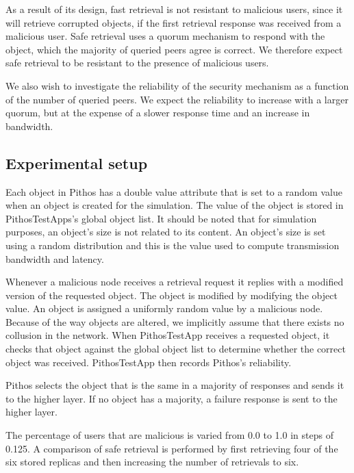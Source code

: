As a result of its design, fast retrieval is not resistant to malicious users, since it will retrieve corrupted objects, if the first retrieval response was received from a malicious user. Safe retrieval uses a quorum mechanism to respond with the object, which the majority of queried peers agree is correct. We therefore expect safe retrieval to be resistant to the presence of malicious users.

We also wish to investigate the reliability of the security mechanism as a function of the number of queried peers. We expect the reliability to increase with a larger quorum, but at the expense of a slower response time and an increase in bandwidth.

\subsection{Experimental setup}

Each object in Pithos has a double value attribute that is set to a random value when an object is created for the simulation. The value of the object is stored in PithosTestApps's global object list. It should be noted that for simulation purposes, an object's size is not related to its content. An object's size is set using a random distribution and this is the value used to compute transmission bandwidth and latency.

Whenever a malicious node receives a retrieval request it replies with a modified version of the requested object. The object is modified by modifying the object value. An object is assigned a uniformly random value by a malicious node. Because of the way objects are altered, we implicitly assume that there exists no collusion in the network. When PithosTestApp receives a requested object, it checks that object against the global object list to determine whether the correct object was received. PithosTestApp then records Pithos's reliability.

Pithos selects the object that is the same in a majority of responses and sends it to the higher layer. If no object has a majority, a failure response is sent to the higher layer.

The percentage of users that are malicious is varied from 0.0 to 1.0 in steps of 0.125. A comparison of safe retrieval is performed by first retrieving four of the six stored replicas and then increasing the number of retrievals to six.

